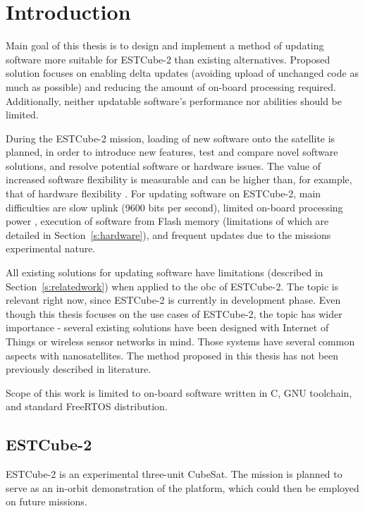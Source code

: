 \newpage
\section{Introduction}

Main goal of this thesis is to design and implement a method of updating software more suitable for ESTCube-2 than existing alternatives. Proposed solution focuses on enabling delta updates (avoiding upload of unchanged code as much as possible) and reducing the amount of on-board processing required. Additionally, neither updatable software’s performance nor abilities should be limited.

During the ESTCube-2 mission, loading of new software onto the satellite is planned, in order to introduce new features, test and compare novel software solutions, and resolve potential software or hardware issues. The value of increased software flexibility is measurable and can be higher than, for example, that of hardware flexibility \cite{Nilchiani2009}. For updating software on ESTCube-2, main difficulties are slow uplink (9600 bits per second), limited on-board processing power \cite{Ehrpais2016}, execution of software from Flash memory \cite{Haljaste2017} (limitations of which are detailed in Section~\ref{s:hardware}), and frequent updates due to the missions experimental nature.

All existing solutions for updating software have limitations (described in Section~\ref{s:relatedwork}) when applied to the \gls{obc} of ESTCube-2. The topic is relevant right now, since ESTCube-2 is currently in development phase. Even though this thesis focuses on the use cases of ESTCube-2, the topic has wider importance - several existing solutions have been designed with Internet of Things or wireless sensor networks \cite{Dunkels2006,Han2005} in mind. Those systems have several common aspects with nanosatellites. The method proposed in this thesis has not been previously described in literature.

Scope of this work is limited to on-board software written in C, GNU toolchain, and standard FreeRTOS distribution.

\subsection{ESTCube-2}

ESTCube-2 is an experimental three-unit CubeSat. The mission is planned to serve as an in-orbit demonstration of the platform, which could then be employed on future missions. \cite{Iakubivskyi2016}

